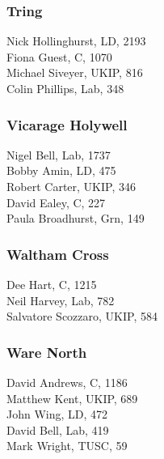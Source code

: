 \documentclass[a4paper,openany,10pt]{book}
\begin{document}
\subsubsection*{Tring}



Nick Hollinghurst, LD, 2193\\
Fiona Guest, C, 1070\\
Michael Siveyer, UKIP, 816\\
Colin Phillips, Lab, 348\\


\subsubsection*{Vicarage Holywell}



Nigel Bell, Lab, 1737\\
Bobby Amin, LD, 475\\
Robert Carter, UKIP, 346\\
David Ealey, C, 227\\
Paula Broadhurst, Grn, 149\\


\subsubsection*{Waltham Cross}



Dee Hart, C, 1215\\
Neil Harvey, Lab, 782\\
Salvatore Scozzaro, UKIP, 584\\


\subsubsection*{Ware North}



David Andrews, C, 1186\\
Matthew Kent, UKIP, 689\\
John Wing, LD, 472\\
David Bell, Lab, 419\\
Mark Wright, TUSC, 59\\
\end{document}
